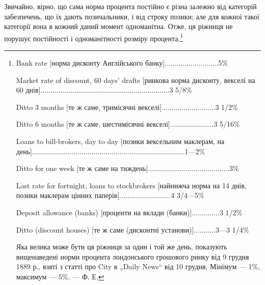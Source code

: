 Звичайно, вірно, що сама норма процента постійно є різна
залежно від категорій забезпечень, що їх дають позичальники,
і від строку позики; але для кожної такої категорії вона
в кожний даний момент одноманітна. Отже, ця ріжниця не порушує
постійності і одноманітності розміру процента.\footnote{
Bank rate [норма дисконту Англійського банку]...........................5\%

Market rate of discount, 60 days’ drafts [ринкова норма дисконту,
векселі на 60 днів].................................................................3 5/8\%

Ditto 3 months [те ж саме, тримісячні векселі]...........................3 1/2\%

Ditto 6 months [те ж саме, шестимісячні векселі]......................3 5/16\%

Loans to bill-brokers, day to day [позики вексельним
маклерам, на день].............................................................................1—2\%

Ditto for one week [те ж саме на тиждень].........................................3\%

Last rate for fortnight, loans to stockbrokers [найнижча норма
на 14 днів, позики маклерам цінних паперів]..........................4 3/4—5\%

Deposit allowance (banks) [проценти на вклади (банки)]..............3 1/2\%

Ditto (discount houses) [те ж саме (дисконтні установи)]...........3—3 1/4\%

Яка велика може бути ця ріжниця за один і той же день, показують вищенаведені
норми процента лондонського грошового ринку від 9 грудня 1889 р.,
взяті з статті про City в „Daily News“ від 10 грудня, Мінімум — 1\%, максимум
— 5\%. — Ф. Е.
}